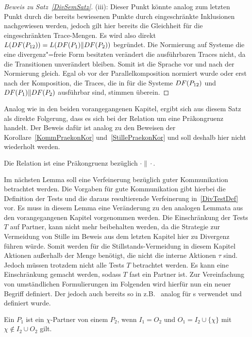 \begin{proof}[Beweis zu Satz~\ref{DivSemSatz}]
  (iii):
  Dieser Punkt könnte analog zum letzten Punkt durch die bereits bewiesenen
  Punkte durch eingeschränkte Inklusionen nachgewiesen werden, jedoch gilt hier
  bereits die Gleichheit für die eingeschränkten Trace-Mengen. Es wird also
  direkt $L (DF (P_{12})) = L (DF (P_1)\|DF (P_2))$ begründet. Die
  Normierung auf Systeme die eine divergenz"=freie Form besitzten verändert die
  ausführbaren Traces nicht, da die Transitionen unverändert bleiben. Somit ist
  die Sprache vor und nach der Normierung gleich. Egal ob vor der
  Parallelkomposition normiert wurde oder erst nach der Komposition, die
  Traces, die in für die Systeme $DF (P_{12})$ und $DF (P_1)\|DF (P_2)$
  ausführbar sind, stimmen überein.
\end{proof}

Analog wie in den beiden vorangegangenen Kapitel, ergibt sich aus diesem Satz
als direkte Folgerung, dass es sich bei der Relation \DRel{} um eine
Präkongruenz handelt. Der Beweis dafür ist analog zu den Beweisen der
Korollare~\ref{KommPraekonKor} und~\ref{StillePraekonKor} und soll deshalb hier
nicht wiederholt werden.

\begin{Kor}
  Die Relation \DRel{} ist eine Präkongruenz bezüglich $\cdot\|\cdot$.
\end{Kor}

Im nächsten Lemma soll eine Verfeinerung bezüglich guter Kommunikation
betrachtet werden. Die Vorgaben für gute Kommunikation gibt hierbei die
Definition der Tests und die daraus resultierende Verfeinerung
in~\ref{DivTestDef} vor. Es muss in diesem Lemma eine Veränderung zu den
analogen Lemmata aus den vorangegangenen Kapitel vorgenommen werden. Die
Einschränkung der Tests $T$ auf Partner, kann nicht mehr beibehalten werden, da
die Strategie zur Vermeidung von Stille im Beweis aus dem letzten Kapitel hier
zu Divergenz führen würde. Somit werden für die Stillstands-Vermeidung in
diesem Kapitel Aktionen außerhalb der Menge \Synch{} benötigt, die nicht die
interne Aktionen $\tau$ sind. Jedoch müssen trotzdem nicht alle Tests $T$
betrachtet werden. Es kann eine Einschränkung gemacht werden, sodass $T$ fast
ein Partner ist. Zur Vereinfachung von umständlichen Formulierungen im
Folgenden wird hierfür nun ein neuer Begriff definiert. Der jedoch auch bereits
so in z.B.~\cite{Schinko2016BA} analog für \EIO{}s verwendet und definiert
wurde.

\begin{Def}
  Ein \MEIO{} $P_1$ ist ein $\chi$-Partner von einem \MEIO{} $P_2$, wenn
  $I_1=O_2$ und $O_1=I_2\cup\{\chi\}$ mit $\chi\notin I_2\cup O_2$ gilt.
\end{Def}

